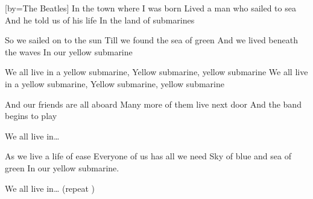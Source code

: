 [by={The Beatles}]
\beginverse
In the town where I was born
Lived a man who sailed to sea
And he told us of his life
In the land of submarines
\endverse

\beginverse
So we sailed on to the sun
Till we found the sea of green
And we lived beneath the waves
In our yellow submarine
\endverse

\beginchorus
We all live in a yellow submarine,
Yellow submarine, yellow submarine
We all live in a yellow submarine,
Yellow submarine, yellow submarine
\endchorus 

\beginverse
And our friends are all aboard
Many more of them live next door
And the band begins to play
\endverse

\beginchorus
We all live in\dots
\endchorus 

\beginverse
As we live a life of ease
Everyone of us has all we need
Sky of blue and sea of green
In our yellow submarine.
\endverse

\beginchorus
We all live in\dots 
(repeat )
\endchorus 
\endsong

